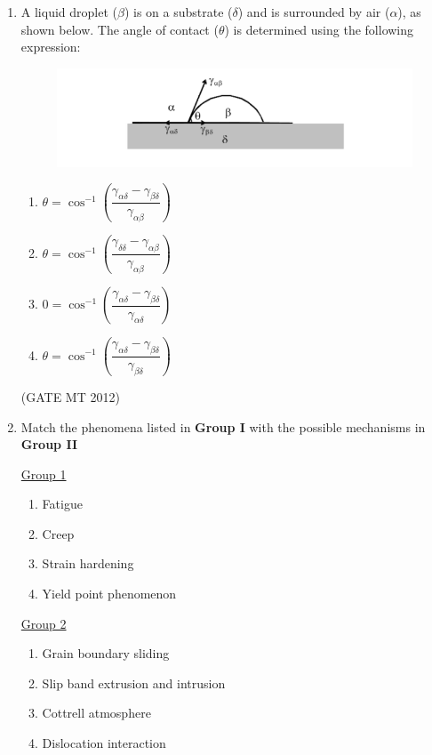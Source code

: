 \documentclass[journal, 11pt, onecolumn]{IEEEtran}
\theoremstyle{remark}
\begin{document}
\begin{enumerate}
\item A liquid droplet ($\beta$) is on a substrate ($\delta$) and is surrounded by air ($\alpha$), as shown below. The angle of contact ($\theta$) is determined using the following expression:

\begin{figure}
    \centering
    \includegraphics[width=0.5\linewidth]{figs/a5f2.png}
    \caption{}
    \label{fig:placeholder}
\end{figure}

\begin{multicols}{2}
\begin{enumerate}  
\item $\theta = \cos^{-1} \left( \dfrac{\gamma_{\alpha \delta} - \gamma_{\beta \delta}}{\gamma_{\alpha \beta}} \right)$
\item $\theta = \cos^{-1} \left( \dfrac{\gamma_{\delta \delta} - \gamma_{\alpha \beta}}{\gamma_{\alpha \beta}} \right)$
\item $0 = \cos^{-1} \left( \dfrac{\gamma_{\alpha \delta} - \gamma_{\beta \delta}}{\gamma_{\alpha \delta}} \right)$
\item $\theta = \cos^{-1} \left( \dfrac{\gamma_{\alpha \delta} - \gamma_{\beta \delta}}{\gamma_{\beta \delta}} \right)$
\end{enumerate}
\end{multicols}
\hfill(GATE MT 2012)

\item Match the phenomena listed in \textbf{Group I} with the possible mechanisms in \textbf{Group II}
\begin{multicols}{2}
\underline{Group 1}
\begin{enumerate}[label=(\Alph*), start=16]
\item Fatigue   
\item Creep
\item Strain hardening  
\item Yield point phenomenon
\end{enumerate}

\underline{Group 2}
\begin{enumerate}[label=(\arabic*), start=1]
\item Grain boundary sliding 
\item Slip band extrusion and intrusion
\item Cottrell atmosphere
\item Dislocation interaction
\end{enumerate}
\end{multicols}


\end{enumerate}
\end{document}
